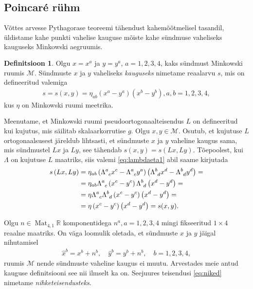 \documentclass[12pt,a4paper,oneside]{article}
\theoremstyle{plain}
\theoremstyle{definition}
\newtheorem{definitsioon}{Definitsioon}[section]
\numberwithin{equation}{section}
\def\R{{\mathbb R}}
\def\M{{\mathcal M}}
\DeclareMathOperator{\Mat}{Mat}
\begin{document}
\subsection{Poincar\'e rühm}

Võttes arvesse Pythagorase teoreemi tähendust kahemõõtmelisel 
tasandil, üldi\-stame 
kahe punkti vahelise kauguse mõiste kahe sündmuse vaheliseks 
kauguseks Minkowski aegruumis.

\begin{definitsioon}
Olgu $x = x^a$ ja $y = y^a$, $a = 1, 2, 3, 4$, kaks sündmust 
Minkowski ruumis $\M$. Sündmuste $x$ ja $y$ vaheliseks 
\emph{kauguseks} nimetame reaalarvu $s$, mis on defineeritud 
valemiga
\begin{align*}
s = s\left(x, y\right) = \eta_{ab} \left(x^a - y^a\right)
\left(x^b - y^b\right), a,b = 1, 2, 3, 4,
\end{align*}
kus $\eta$ on Minkowski ruumi meetrika.
\end{definitsioon}

Meenutame, et Minkowski ruumi pseudoortogonaalteisendus $L$ on 
defineeritud kui kujutus, mis säilitab skalaarkorrutise $g$. Olgu 
$x, y \in \M$. Osutub, et kujutuse $L$ ortogonaalsusest järeldub 
lihtsasti, et sündmuste $x$ ja $y$ vaheline kaugus sama, mis 
sündmustel $Lx$ ja $Ly$, see tähendab $s\left(x, y\right) = 
s\left(Lx, Ly\right)$. Tõepoolest, kui $\Lambda$ on kujutuse $L$ 
maatriks, siis valemi \ref{eq:lambdaeta1} abil saame kirjutada
\begin{align*}
s\left(Lx, Ly\right) &= \eta_{ab} \left(\Lambda\indices{^a_c} x^c - 
	\Lambda\indices{^a_c} y^a\right) \left(\Lambda\indices{^b_d} 
	x^d - \Lambda\indices{^b_d} y^d\right) = \\
&= \eta_{ab} \Lambda\indices{^a_c} \left(x^c - y^c\right) 
	\Lambda\indices{^b_d} \left(x^d - y^d\right) = \\
&= \eta \Lambda\indices{^a_c} \Lambda\indices{^b_d} 
	\left(x^c - y^c\right) \left(x^d - y^d\right) = \\
&= \eta \left(x^c - y^c\right) \left(x^d - y^d\right) = s(x, y).
\end{align*}

Olgu $n \in \Mat_{4, 1} \R$ komponentidega $n^a, a = 1, 2, 3, 4$ 
mingi fikseeritud $1 \times 4$ reaalne maatriks. On väga loomulik 
oletada, et sündmuste $x$ ja $y$ jäigal nihutamisel
\begin{align} \label{eq:niked}
\hat{x}^b = x^b + n^b, \quad \hat{y}^b = y^b + n^b, \quad 
b = 1, 2, 3, 4,
\end{align}
ruumis $\M$ nende sündmuste vaheline kaugus ei muutu. Arvestades 
meie antud kauguse definitsiooni see nii ilmselt ka on. Seejuures 
teisendusi \ref{eq:niked} nimetame \emph{nihketeisendusteks}.
\end{document}
